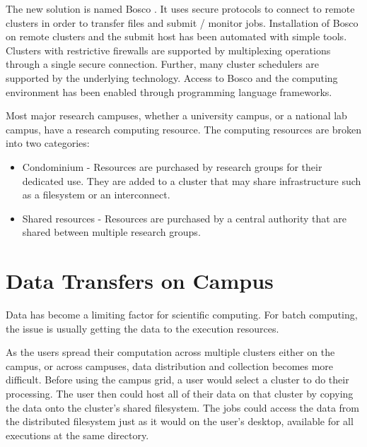 The new solution is named Bosco \cite{chep2013weitzel}.  It uses secure protocols to connect to remote clusters in order to transfer files and submit / monitor jobs.  Installation of Bosco on remote clusters and the submit host has been automated with simple tools.  Clusters with restrictive firewalls are supported by multiplexing operations through a single secure connection.  Further, many cluster schedulers are supported by the underlying technology.  Access to Bosco and the computing environment has been enabled through programming language frameworks.





Most major research campuses, whether a university campus, or a national lab campus, have a research computing resource.  The computing resources are broken into two categories:

\begin{itemize}

\item Condominium - Resources are purchased by research groups for their dedicated use.  They are added to a cluster that may share infrastructure such as a filesystem or an interconnect.
\item Shared resources -  Resources are purchased by a central authority that are shared between multiple research groups.

\end{itemize}





\section{Data Transfers on Campus}

Data has become a limiting factor for scientific computing.  For batch computing, the issue is usually getting the data to the execution resources.  

As the users spread their computation across multiple clusters either on the campus, or across campuses, data distribution and collection becomes more difficult.  Before using the campus grid, a user would select a cluster to do their processing.  The user then could host all of their data on that cluster by copying the data onto the cluster's shared filesystem.  The jobs could access the data from the distributed filesystem just as it would on the user's desktop, available for all executions at the same directory.


